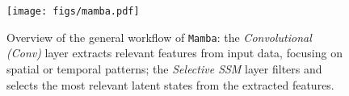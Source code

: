 \begin{figure}[t]
    \centering
    \texttt{[image: figs/mamba.pdf]}
    
    \caption{
    Overview of the general workflow of \texttt{Mamba}: 
    the \emph{Convolutional (Conv)} layer extracts relevant features from input data, focusing on spatial or temporal patterns; 
    the \emph{Selective SSM} layer filters and selects the most relevant latent states from the extracted features.
    }
    \label{fig:mamba}
\end{figure}